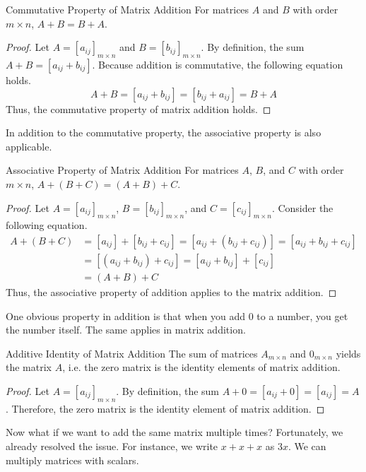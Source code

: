\documentclass[../main.tex]{subfiles}
\begin{document}
\begin{theorem}{}{Commutative Property of Matrix Addition}
For matrices $A$ and $B$ with order $m \times n$, $A + B = B + A$.
\end{theorem}
\begin{proof}
Let $A = [a_{ij}]_{m \times n}$ and $B = [b_{ij}]_{m \times n}$.
By definition, the sum $A + B = [a_{ij} + b_{ij}]$. Because
addition is commutative, the following equation holds.
\[
A + B
= [a_{ij} + b_{ij}]
= [b_{ij} + a_{ij}]
= B + A
\]
Thus, the commutative property of matrix addition holds.
\end{proof}

In addition to the commutative property, the associative property
is also applicable.

\begin{theorem}{}{Associative Property of Matrix Addition}
For matrices $A$, $B$, and $C$ with order $m \times n$,
$A + (B + C) = (A + B) + C$.
\end{theorem}
\begin{proof}
Let $A = [a_{ij}]_{m \times n}$, $B = [b_{ij}]_{m \times n}$,
and $C = [c_{ij}]_{m \times n}$. Consider the following equation.
\begin{align*}
    A + (B + C)
    &= [a_{ij}] + [b_{ij} + c_{ij}]
     = [a_{ij} + (b_{ij} + c_{ij})]
     = [a_{ij} + b_{ij} + c_{ij}] \\
    &= [(a_{ij} + b_{ij}) + c_{ij}]
     = [a_{ij} + b_{ij}] + [c_{ij}] \\
    &= (A + B) + C
\end{align*}
Thus, the associative property of addition applies to the matrix
addition.
\end{proof}

One obvious property in addition is that when you add $0$ to a number,
you get the number itself. The same applies in matrix addition.

\begin{theorem}{}{Additive Identity of Matrix Addition}
The sum of matrices $A_{m \times n}$ and $0_{m \times n}$ yields
the matrix $A$, i.e. the zero matrix is the identity elements of
matrix addition.
\end{theorem}
\begin{proof}
Let $A = [a_{ij}]_{m \times n}$. By definition, the sum $A + 0
= [a_{ij} + 0] = [a_{ij}] = A$. Therefore, the zero matrix is the
identity element of matrix addition.
\end{proof}

Now what if we want to add the same matrix multiple times?
Fortunately, we already resolved the issue. For instance,
we write $x + x + x$ as $3x$. We can multiply matrices with scalars.
\end{document}
